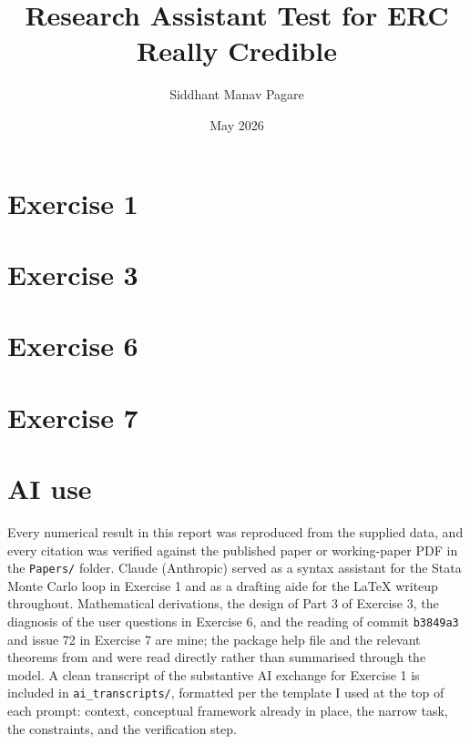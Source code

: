 \documentclass[11pt,a4paper]{article}
\title{Research Assistant Test for ERC Really Credible }
\author{Siddhant Manav Pagare }
\date{May 2026}
\begin{document}
\maketitle

\newpage

\section*{Exercise 1}


\newpage

\section*{Exercise 3}


\newpage

\section*{Exercise 6}


\newpage

\section*{Exercise 7}






\section*{AI use}

Every numerical result in this report was reproduced from the supplied data, and every citation was verified against the published paper or working-paper PDF in the \texttt{Papers/} folder. Claude (Anthropic) served as a syntax assistant for the Stata Monte Carlo loop in Exercise 1 and as a drafting aide for the LaTeX writeup throughout. Mathematical derivations, the design of Part 3 of Exercise 3, the diagnosis of the user questions in Exercise 6, and the reading of commit \texttt{b3849a3} and issue 72 in Exercise 7 are mine; the package help file and the relevant theorems from \citet{dCDH2023} and \citet{dCDH2024} were read directly rather than summarised through the model. A clean transcript of the substantive AI exchange for Exercise 1 is included in \texttt{ai\_transcripts/}, formatted per the template I used at the top of each prompt: context, conceptual framework already in place, the narrow task, the constraints, and the verification step.
\end{document}
